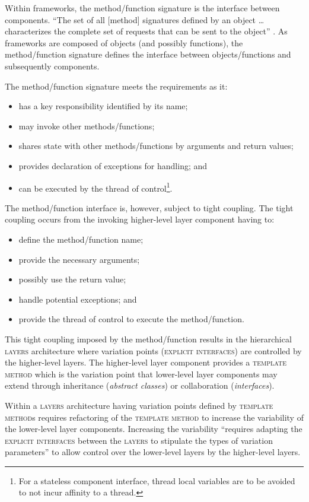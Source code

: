 \documentclass[prodmode]{style/acmlarge}
\begin{document}
Within frameworks, the method/function signature is the interface between
components.  ``The set of all [method] signatures defined by an object \ldots
characterizes the complete set of requests that can be sent to the object''
\cite[p. 13]{gof}.  As frameworks are composed of objects (and possibly
functions), the method/function signature defines the interface between
objects/functions and subsequently components.

The method/function signature meets the requirements as it:
\begin{itemize}
  \item has a key responsibility identified by its name;
  \item may invoke other methods/functions;
  \item shares state with other methods/functions by arguments and return values;
  \item provides declaration of exceptions for handling; and
  \item can be executed by the thread of control\footnote{For a stateless component interface, thread local variables are to be avoided to not incur affinity to a thread.}.
\end{itemize}

The method/function interface is, however, subject to tight coupling.  The tight
coupling occurs from the invoking higher-level layer component having to:
\begin{itemize}
  \item define the method/function name;
  \item provide the necessary arguments;
  \item possibly use the return value;
  \item handle potential exceptions; and
  \item provide the thread of control to execute the method/function.
\end{itemize}

This tight coupling imposed by the method/function results in the hierarchical
\textsc{layers} architecture where variation points (\textsc{explicit
interfaces}) are controlled by the higher-level layers.  The higher-level layer
component provides a \textsc{template method} \cite{gof} which is the variation
point that lower-level layer components may extend through inheritance
(\textit{abstract classes}) or collaboration (\textit{interfaces}).

Within a \textsc{layers} architecture having variation points defined by
\textsc{template method}s requires refactoring of the \textsc{template method}
to increase the variability of the lower-level layer components.  Increasing the
variability ``requires adapting the \textsc{explicit interfaces} between the
\textsc{layers} to stipulate the types of variation parameters'' \cite[p.
5]{ioc} to allow control over the lower-level layers by the higher-level layers.
\end{document}
